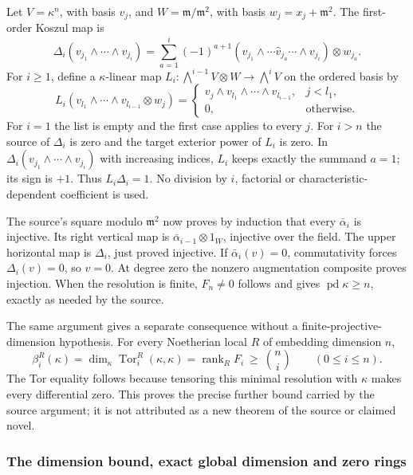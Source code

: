 Let \(V=\kappa^n\), with basis \(v_j\), and \(W=\mathfrak m/\mathfrak m^2\), with basis \(w_j=x_j+\mathfrak m^2\). The first-order Koszul map is \[
\Delta_i(v_{j_1}\wedge\cdots\wedge v_{j_i})
=\sum_{a=1}^i(-1)^{a+1}
(v_{j_1}\wedge\cdots\widehat v_{j_a}\cdots\wedge v_{j_i})\otimes w_{j_a}.
\] For \(i\ge1\), define a \(\kappa\)-linear map \(L_i:\bigwedge^{i-1}V\otimes W\to\bigwedge^iV\) on the ordered basis by \[
L_i(v_{l_1}\wedge\cdots\wedge v_{l_{i-1}}\otimes w_j)
=\begin{cases}
v_j\wedge v_{l_1}\wedge\cdots\wedge v_{l_{i-1}},
 &j<l_1,\\
0,&\text{otherwise}.
\end{cases}
\] For \(i=1\) the list is empty and the first case applies to every \(j\). For \(i>n\) the source of \(\Delta_i\) is zero and the target exterior power of \(L_i\) is zero. In \(\Delta_i(v_{j_1}\wedge\cdots\wedge v_{j_i})\) with increasing indices, \(L_i\) keeps exactly the summand \(a=1\); its sign is \(+1\). Thus \(L_i\Delta_i=1\). No division by \(i\), factorial or characteristic-dependent coefficient is used.

The source's square modulo \(\mathfrak m^2\) now proves by induction that every \(\bar\alpha_i\) is injective. Its right vertical map is \(\bar\alpha_{i-1}\otimes1_W\), injective over the field. The upper horizontal map is \(\Delta_i\), just proved injective. If \(\bar\alpha_i(v)=0\), commutativity forces \(\Delta_i(v)=0\), so \(v=0\). At degree zero the nonzero augmentation composite proves injection. When the resolution is finite, \(F_n\ne0\) follows and gives \(\operatorname{pd}\kappa\ge n\), exactly as needed by the source.

The same argument gives a separate consequence without a finite-projective-dimension hypothesis. For every Noetherian local \(R\) of embedding dimension \(n\), \[
\beta_i^R(\kappa)=\dim_\kappa\operatorname{Tor}_i^R(\kappa,\kappa)
=\operatorname{rank}_RF_i\ \ge\ \binom ni\qquad(0\le i\le n).
\] The Tor equality follows because tensoring this minimal resolution with \(\kappa\) makes every differential zero. This proves the precise further bound carried by the source argument; it is not attributed as a new theorem of the source or claimed novel.

\subsubsection{The dimension bound, exact global dimension and zero rings}\label{algebra-proof-023-the-dimension-bound-exact-global-dimension-and-zero-rings}

